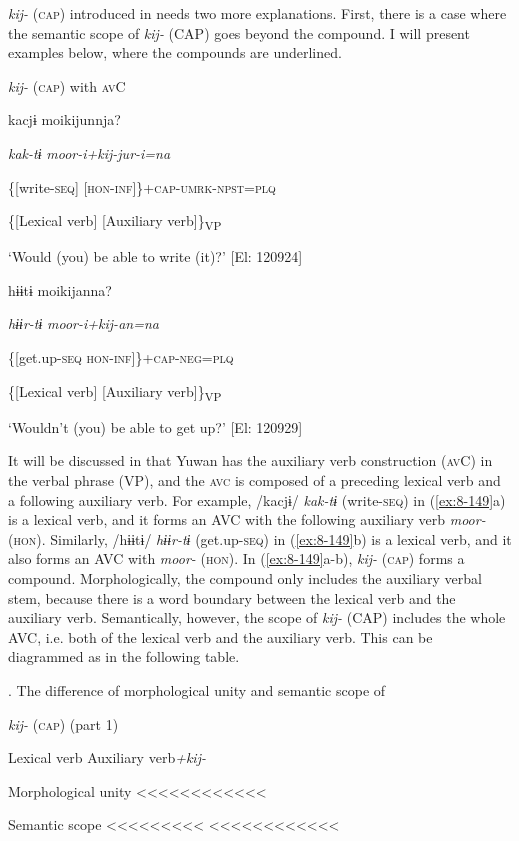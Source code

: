 \textit{kij-} (\textsc{cap}) introduced in  needs two more explanations. First, there is a case where the semantic scope of \textit{kij-} (CAP) goes beyond the compound. I will present examples below, where the compounds are underlined.

\ea\label{ex:8-149}
  \textit{kij-} (\textsc{cap}) with \textsc{av}C

\ea {\TM}
\glll  kacjɨ  moikijunnja?

      \textit{kak-tɨ}  \textit{moor-i+kij{}-jur-i=na}

      \{[write-\textsc{seq}]  [\textsc{hon}-\textsc{inf}]\}+\textsc{cap}-\textsc{umrk}-\textsc{npst}=\textsc{plq}

      \{[Lexical verb]  [Auxiliary verb]\}\textsubscript{VP}

\glt ‘Would (you) be able to write (it)?’ [El: 120924]

\ex {\TM}
\glll  hɨɨtɨ  moikijanna?

      \textit{hɨɨr-tɨ}  \textit{moor-i+kij{}-an=na}

      \{[get.up-\textsc{seq}  \textsc{hon}-\textsc{inf}]\}+\textsc{cap}-\textsc{neg}=\textsc{plq}

      \{[Lexical verb]  [Auxiliary verb]\}\textsubscript{VP}

\glt ‘Wouldn’t (you) be able to get up?’ [El: 120929]

It will be discussed in  that Yuwan has the auxiliary verb construction (\textsc{av}C) in the verbal phrase (VP), and the \textsc{avc} is composed of a preceding lexical verb and a following auxiliary verb. For example, /kacjɨ/ \textit{kak-tɨ} (write-\textsc{seq}) in (\ref{ex:8-149}a) is a lexical verb, and it forms an AVC with the following auxiliary verb \textit{moor-} (\textsc{hon}). Similarly, /hɨɨtɨ/ \textit{hɨɨr-tɨ} (get.up-\textsc{seq}) in (\ref{ex:8-149}b) is a lexical verb, and it also forms an AVC with \textit{moor-} (\textsc{hon}). In (\ref{ex:8-149}a-b), \textit{kij-} (\textsc{cap}) forms a compound. Morphologically, the compound only includes the auxiliary verbal stem, because there is a word boundary between the lexical verb and the auxiliary verb. Semantically, however, the scope of \textit{kij-} (CAP) includes the whole AVC, i.e. both of the lexical verb and the auxiliary verb. This can be diagrammed as in the following table.

\begin{table}
\caption{\label{tab:key:89}. The difference of morphological unity and semantic scope of} \textmd{\textit{kij-}}\textmd{ (\textsc{cap}) (part 1)}

  Lexical verb  Auxiliary verb\textit{+kij-}

Morphological unity    <<<<<<<<<<<<

Semantic scope  <<<<<<<<<  <<<<<<<<<<<<
\end{table}

